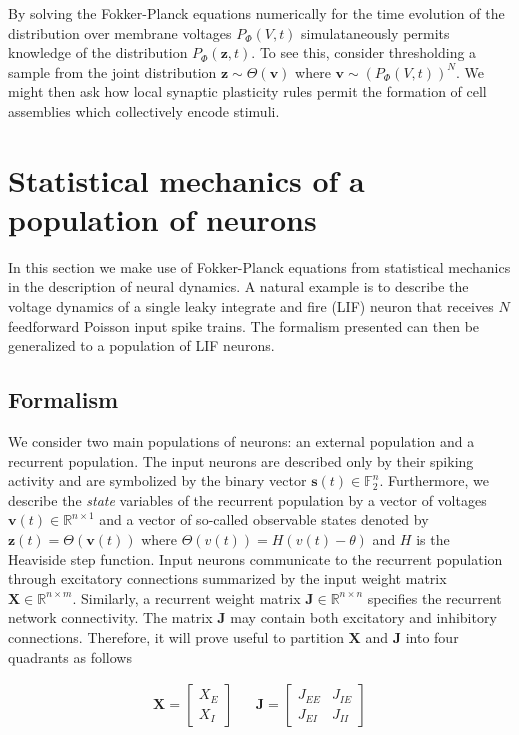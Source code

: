 \documentclass{ucetd}
\begin{document}
By solving the Fokker-Planck equations numerically for the time evolution of the distribution over membrane voltages $P_{\Phi}(V,t)$ simulataneously permits knowledge of the distribution $P_{\Phi}(\mathbf{z},t)$. To see this, consider thresholding a sample from the joint distribution $\mathbf{z} \sim \Theta\left(\mathbf{v}\right)$ where $\mathbf{v} \sim (P_{\Phi}(V,t))^{N}$. We might then ask how local synaptic plasticity rules permit the formation of cell assemblies which collectively encode stimuli.

\chapter{Statistical mechanics of a population of neurons}

In this section we make use of Fokker-Planck equations from statistical mechanics in the description of neural dynamics. A natural example is to describe the voltage dynamics of a single leaky integrate and fire (LIF) neuron that receives $N$ feedforward Poisson input spike trains. The formalism presented can then be generalized to a population of LIF neurons.\\

\section{Formalism}

We consider two main populations of neurons: an external population and a recurrent population. The input neurons are described only by their spiking activity and are symbolized by the binary vector $\mathbf{s}(t)\in \mathbb{F}_{2}^{n}$. Furthermore, we describe the \emph{state} variables of the recurrent population by a vector of voltages $\mathbf{v}(t)\in \mathbb{R}^{n\times 1}$ and a vector of so-called observable states denoted by $\mathbf{z}(t) = \Theta(\mathbf{v}(t))$ where $\Theta(v(t)) = H(v(t) - \theta)$ and $H$ is the Heaviside step function. Input neurons communicate to the recurrent population through excitatory connections summarized by the input weight matrix $\mathbf{X}\in \mathbb{R}^{n\times m}$. Similarly, a recurrent weight matrix $\mathbf{J}\in \mathbb{R}^{n\times n}$ specifies the recurrent network connectivity. The matrix $\mathbf{J}$ may contain both excitatory and inhibitory connections. Therefore, it will prove useful to partition $\mathbf{X}$ and $\mathbf{J}$ into four quadrants as follows

\begin{align}
\mathbf{X} = \begin{bmatrix}
    X_{E}\\
    X_{I} 
\end{bmatrix}  && \mathbf{J} = \begin{bmatrix}
    J_{EE} & J_{IE} \\
    J_{EI} & J_{II} 
\end{bmatrix} 
\end{align}
\end{document}
